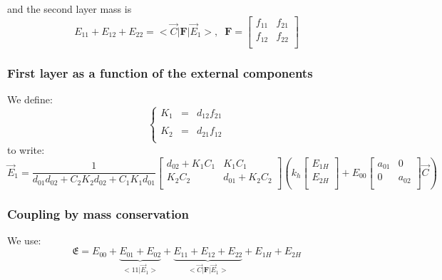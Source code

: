 \documentclass[aps,onecolumn,12pt]{revtex4}
\newcommand{\mymat}[1]{{\bm{#1}}}
\begin{document}
and the second layer mass is
\begin{equation}
E_{11} + E_{12} + E_{22} = <{\vec{C}} \vert \mymat{F} \vert \vec{E}_1 >, \;\;
 \mymat{F} 
 = \begin{bmatrix}
	f_{11} & f_{21}\\
	f_{12} & f_{22}\\
\end{bmatrix}
\end{equation}

\subsubsection{First layer as a function of the external components}
We define:
\begin{equation}
\left\lbrace
\begin{array}{rcl}
K_1 & = & d_{12} f_{21} \\
\\
K_2 & = &  d_{21} f_{12}\\
\end{array}
\right.
\end{equation}
to write:
\begin{equation}
\boxed{
	\vec{E}_1 =  \dfrac{1}{d_{01} d_{02}+ C_2 K_2 d_{02}+C_1K_1 d_{01} }	
 \begin{bmatrix}
   d_{02} + K_1 C_1 & K_1 C_1 \\
   K_2C_2 & d_{01} + K_2 C_2 \\
 \end{bmatrix}
\left(
k_h 
 \begin{bmatrix}
 E_{1H}\\
 E_{2H}\\
 \end{bmatrix}
 +E_{00} 
 \begin{bmatrix}
 a_{01} & 0 \\
 0 & a_{02}\\
 \end{bmatrix}
 \vec{C}
\right)
}
\end{equation}

\subsubsection{Coupling by mass conservation}
We use:
\begin{equation}
	\mathfrak{E} = E_{00} + \underbrace{E_{01} + E_{02}}_{<1 1|\vec{E}_1>} + \underbrace{E_{11} + E_{12} + E_{22}}_{<\vec{C}|\mymat{F}|\vec{E}_1>} + E_{1H} + E_{2H} 
\end{equation}
\end{document}
